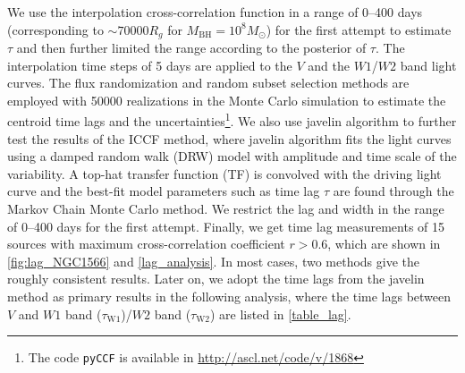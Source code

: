 \documentclass[linenumbers]{aastex631}
\begin{document}
We use the interpolation cross-correlation function \citep[ICCF;][]{1998PASP..110..660P,2018ascl.soft05032S} in a range of 0--400 days (corresponding to $\sim 70000 R_g$ for $M_\mathrm{BH}=10^8 M_{\odot}$) for the first attempt to estimate $\tau$ and then further limited the range according to the posterior of $\tau$. The interpolation time steps of 5 days are applied to the $V$ and the $W1$/$W2$ band light curves. The flux randomization and random subset selection methods are employed with 50000 realizations in the Monte Carlo simulation to estimate the centroid time lags and the uncertainties\footnote{The code \texttt{pyCCF} is available in \url{http://ascl.net/code/v/1868}}. We also use {\sc javelin} algorithm to further test the results of the ICCF method, where {\sc javelin} algorithm fits the light curves using a damped random walk (DRW) model with amplitude and time scale of the variability. A top-hat transfer function (TF) is convolved with the driving light curve and the best-fit model parameters such as time lag $\tau$ are found through the Markov Chain Monte Carlo method. We restrict the lag and width in the range of 0--400 days for the first attempt. Finally,  we get time lag measurements of 15 sources with maximum cross-correlation coefficient $r>0.6$, which are shown in \autoref{fig:lag_NGC1566} and \autoref{lag_analysis}. In most cases, two methods give the roughly consistent results. Later on, we adopt the time lags from the {\sc javelin} method as primary results in the following analysis, where the time lags between $V$ and $W1$ band ($\tau_\mathrm{W1}$)/$W2$ band ($\tau_\mathrm{W2}$) are listed in \autoref{table_lag}. 
\end{document}
